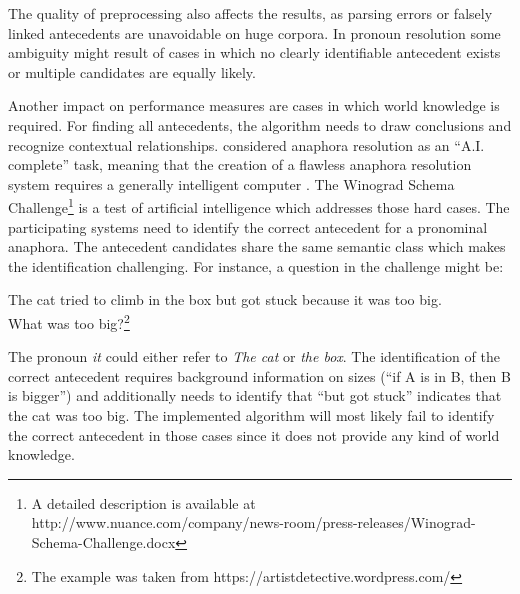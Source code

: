 The quality of preprocessing also affects the results, as parsing errors or falsely linked antecedents are unavoidable on huge corpora. In pronoun resolution some ambiguity might result of cases in which no clearly identifiable antecedent exists or multiple candidates are equally likely. 

Another impact on performance measures are cases in which world knowledge is required. For finding all antecedents, the algorithm needs to draw conclusions and recognize contextual relationships. \cite{baldwin1997cogniac} considered anaphora resolution as an ``A.I. complete'' task, meaning that the creation of a flawless anaphora resolution system requires a generally intelligent computer \citep{shapiro1992encyclopedia}. The Winograd Schema Challenge\footnote{A detailed description is available at http://www.nuance.com/company/news-room/press-releases/Winograd-Schema-Challenge.docx} is a test of artificial intelligence which addresses those hard cases. The participating systems need to identify the correct antecedent for a pronominal anaphora. The antecedent candidates share the same semantic class which makes the identification challenging. For instance, a question in the challenge might be:
\begin{addmargin}[25pt]{25pt}
The cat tried to climb in the box but got stuck because it was too big.\\ What was too big?\footnote{The example was taken from https://artistdetective.wordpress.com/}
\end{addmargin}

The pronoun \textit{it} could either refer to \textit{The cat} or \textit{the box}. The identification of the correct antecedent requires background information on sizes (``if A is in B, then B is bigger'') and additionally needs to identify that ``but got stuck'' indicates that the cat was too big. The implemented algorithm will most likely fail to identify the correct antecedent in those cases since it does not provide any kind of world knowledge.

